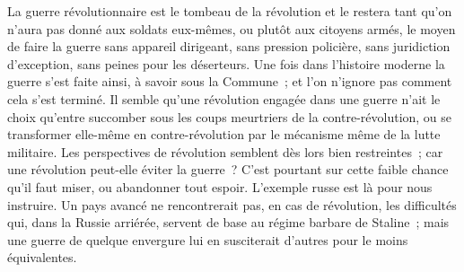 \documentclass[french,twoside]{book} %
\begin{document}
La guerre révolutionnaire est le tombeau de la révolution et le restera tant qu’on n’aura pas donné aux soldats eux-mêmes, ou plutôt aux citoyens armés, le moyen de faire la guerre sans appareil dirigeant, sans pression policière, sans juridiction d'exception, sans peines pour les déserteurs. Une fois dans l'histoire moderne la guerre s'est faite ainsi, à savoir sous la Commune ; et l'on n'ignore pas comment cela s'est terminé. Il semble qu'une révolution engagée dans une guerre n'ait le choix qu'entre succomber sous les coups meurtriers de la contre-révolution, ou se transformer elle-même en contre-révolution par le mécanisme même de la lutte militaire. Les perspectives de révolution sem­blent dès lors bien restreintes ; car une révolution peut-elle éviter la guerre ? C'est pourtant sur cette faible chance qu'il faut miser, ou abandonner tout espoir. L'exemple russe est là pour nous instruire. Un pays avancé ne rencon­trerait pas, en cas de révolution, les difficultés qui, dans la Russie arriérée, servent de base au régime barbare de Staline ; mais une guerre de quelque envergure lui en susciterait d'autres pour le moins équivalentes.\par
\end{document}
